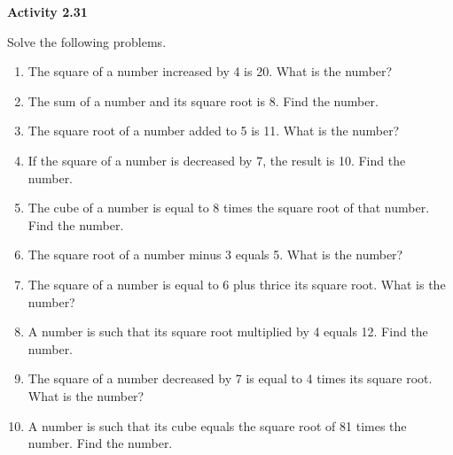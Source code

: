 \vspace{0.3ex}
\noindent\textbf{Activity 2.31}

\vspace{0.2ex}

Solve the following problems. 

\begin{enumerate}[noitemsep, label = \color{blue}\arabic*. ]
    \item The square of a number increased by 4 is 20. What is the number?
    \item The sum of a number and its square root is 8. Find the number.
    \item The square root of a number added to 5 is 11. What is the number?
    \item If the square of a number is decreased by 7, the result is 10. Find the number.
    \item The cube of a number is equal to 8 times the square root of that number. Find the number.
    \item The square root of a number minus 3 equals 5. What is the number?
    \item The square of a number is equal to 6 plus thrice its square root. What is the number?
    \item A number is such that its square root multiplied by 4 equals 12. Find the number.
    \item The square of a number decreased by 7 is equal to 4 times its square root. What is the number?
    \item A number is such that its cube equals the square root of 81 times the number. Find the number.
\end{enumerate}

